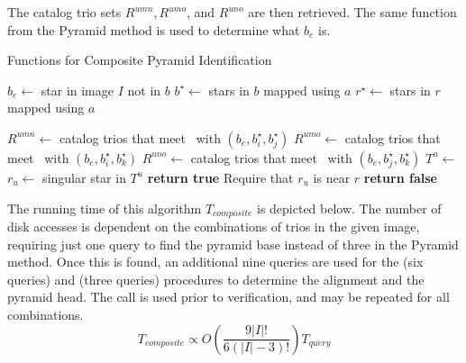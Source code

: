 The catalog trio sets $R^{umn}, R^{umo}$, and $R^{uno}$ are then retrieved.
The same function  from the Pyramid method is used to determine what $b_e$ is.
\begin{algorithm}
    \caption{Functions for Composite Pyramid Identification} \label{algorithm:compositePyramidHelpers}
    \begin{algorithmic}[1]
        \State $b_e \gets $ star in image $I$ not in $b$
        \State $b^{\star} \gets $ stars in $b$ mapped using $a$
        \State $r^{\star} \gets $ stars in $r$ mapped using $a$

        \State $R^{umn} \gets $ catalog trios that meet~ with $(b_e, b^{\star}_i,
        b^{\star}_j)$
        \State $R^{umo} \gets $ catalog trios that meet~ with $(b_e, b^{\star}_i,
        b^{\star}_k)$
        \State $R^{uno} \gets $ catalog trios that meet~ with $(b_e, b^{\star}_j,
        b^{\star}_k)$
        \State $T^u \gets $ 
        \\
        \State $r_u \gets $ singular star in $T^u$
        \State \textbf{return true} \Comment Require that $r_u$ is near $r$
        \EndIf
        \EndIf
        \State \textbf{return false}
        \EndFunction
    \end{algorithmic}
\end{algorithm}

The running time of this algorithm $T_{composite}$ is depicted below.
The number of disk accesses is dependent on the combinations of trios in the given image, requiring just one query to
find the pyramid base instead of three in the Pyramid method.
Once this is found, an additional nine queries are used for the  (six queries) and
 (three queries) procedures to determine the alignment and the pyramid head.
The  call is used prior to verification, and may be repeated for all combinations.
\begin{equation}\label{eq:compositeComplexity}
T_{composite} \propto O\left( \frac{9|I|!}{6 \left( |I| -3 \right)!} \right) T_{query}
\end{equation}

\begin{table*}[ht]
\end{table*}